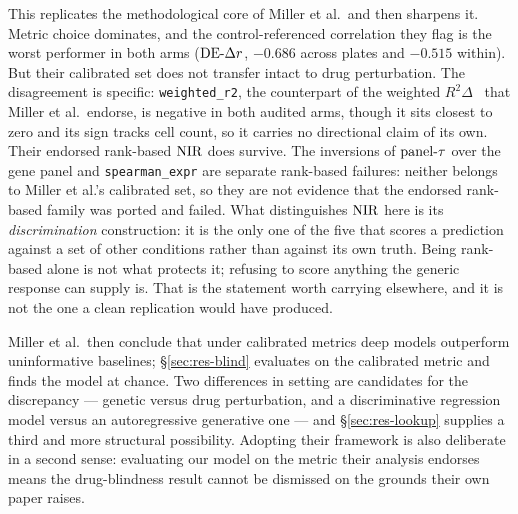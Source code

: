 This replicates the methodological core of Miller et al.\ and then sharpens it. Metric choice
dominates, and the control-referenced correlation they flag is the worst performer in both arms
($\textrm{DE-}\Delta r$, $-0.686$ across plates and $-0.515$ within). But their calibrated set does not transfer
intact to drug perturbation. The disagreement is specific: \texttt{weighted\_r2}, the counterpart
of the weighted $R^2\Delta$~\cite{mejia} that Miller et al.\ endorse, is negative in both audited
arms, though it sits closest to zero and its sign tracks cell count, so it carries no directional
claim of its own. Their endorsed rank-based $\textrm{NIR}$ does survive. The inversions of $\textrm{panel-}\tau$ over
the gene panel and \texttt{spearman\_expr} are separate rank-based failures: neither belongs to
Miller et al.'s calibrated set, so they are not evidence that the endorsed rank-based family was
ported and failed. What distinguishes $\textrm{NIR}$ here is its \emph{discrimination} construction: it is
the only one of the five that scores a prediction against a set of other conditions rather than
against its own truth. Being rank-based alone is not what protects it; refusing to score anything
the generic response can supply is.
That is the statement worth carrying elsewhere, and it is not the one a clean replication would
have produced.

Miller et al.\ then conclude that under calibrated metrics deep models outperform uninformative
baselines; \S\ref{sec:res-blind} evaluates on the calibrated metric and finds the model at chance.
Two differences in setting are candidates for the discrepancy --- genetic versus drug perturbation,
and a discriminative regression model versus an autoregressive generative one --- and
\S\ref{sec:res-lookup} supplies a third and more structural possibility. Adopting their framework
is also deliberate in a second sense: evaluating our model on the metric their analysis endorses
means the drug-blindness result cannot be dismissed on the grounds their own paper raises.

